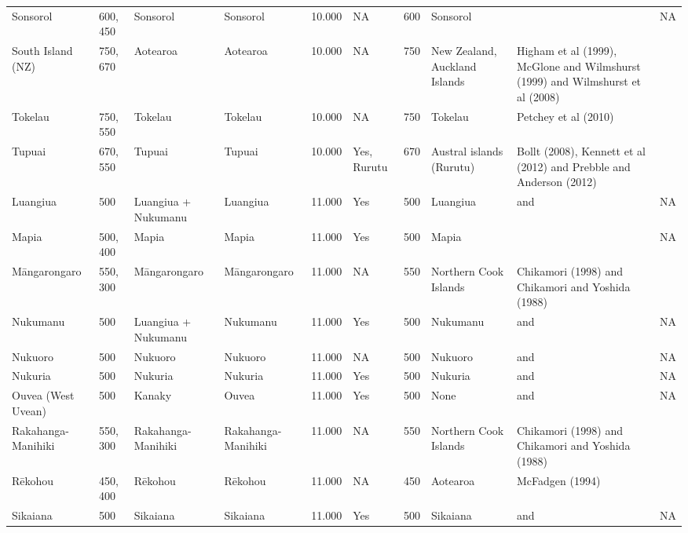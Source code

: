 \begin{longtable}{p{4.5cm}p{2cm}p{2cm}p{2cm}p{4cm}p{4cm}p{4cm}p{4cm}p{4cm}p{4cm}}
  Sonsorol & 600, 450 & Sonsorol & Sonsorol & 10.000 & NA & 600 & Sonsorol & \citet{intoh2008ongoing} & NA \\ 
  South Island (NZ) & 750, 670 & Aotearoa & Aotearoa & 10.000 & NA & 750 & New Zealand, Auckland Islands & Higham et al (1999), McGlone and Wilmshurst (1999) and Wilmshurst et al (2008) & \citet{rieth_cochrane_2018} \\ 
  Tokelau & 750, 550 & Tokelau & Tokelau & 10.000 & NA & 750 & Tokelau & Petchey et al (2010) & \citet{rieth_cochrane_2018} \\ 
  Tupuai & 670, 550 & Tupuai & Tupuai & 10.000 & Yes, Rurutu & 670 & Austral islands (Rurutu) & Bollt (2008), Kennett et al (2012) and Prebble and Anderson (2012) & \citet{rieth_cochrane_2018} \\ 
  Luangiua & 500 & Luangiua + Nukumanu & Luangiua & 11.000 & Yes & 500 & Luangiua & \citet{kirch2012basline} and \citet{carson2012recent} & NA \\ 
  Mapia & 500, 400 & Mapia & Mapia & 11.000 & Yes & 500 & Mapia & \citet{intoh2007reconnaissance} & NA \\ 
  Māngarongaro & 550, 300 & Māngarongaro & Māngarongaro & 11.000 & NA & 550 & Northern Cook Islands & Chikamori (1998) and Chikamori and Yoshida (1988) & \citet{rieth_cochrane_2018} \\ 
  Nukumanu & 500 & Luangiua + Nukumanu & Nukumanu & 11.000 & Yes & 500 & Nukumanu & \citet{kirch2012basline} and \citet{carson2012recent} & NA \\ 
  Nukuoro & 500 & Nukuoro & Nukuoro & 11.000 & NA & 500 & Nukuoro & \citet{kirch2012basline} and \citet{carson2012recent} & NA \\ 
  Nukuria & 500 & Nukuria & Nukuria & 11.000 & Yes & 500 & Nukuria & \citet{kirch2012basline} and \citet{carson2012recent} & NA \\ 
  Ouvea (West Uvean) & 500 & Kanaky & Ouvea & 11.000 & Yes & 500 & None & \citet{kirch2012basline} and \citet{carson2012recent} & NA \\ 
  Rakahanga-Manihiki & 550, 300 & Rakahanga-Manihiki & Rakahanga-Manihiki & 11.000 & NA & 550 & Northern Cook Islands & Chikamori (1998) and Chikamori and Yoshida (1988) & \citet{rieth_cochrane_2018} \\ 
  Rēkohou & 450, 400 & Rēkohou & Rēkohou & 11.000 & NA & 450 & Aotearoa & McFadgen (1994) & \citet{rieth_cochrane_2018} \\ 
  Sikaiana & 500 & Sikaiana & Sikaiana & 11.000 & Yes & 500 & Sikaiana & \citet{kirch2012basline} and \citet{carson2012recent} & NA \\ 

\end{longtable}
